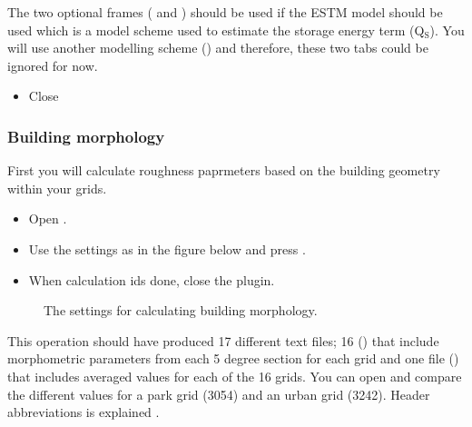 \documentclass[letterpaper,10pt,english]{sphinxmanual}
\begin{document}
The two optional frames ( and ) should be used if the ESTM model should be used which is a model scheme used to estimate the storage energy term (Q$_{\text{S}}$). You will use another modelling scheme () and therefore, these two tabs could be ignored for now.
\begin{itemize}
\item {} 
Close 

\end{itemize}


\subsubsection{Building morphology}
\label{\detokenize{Tutorials/SuewsSpatial:building-morphology}}
First you will calculate roughness paprmeters based on the building geometry within your grids.
\begin{itemize}
\item {} 
Open .

\item {} 
Use the settings as in the figure below and press .

\item {} 
When calculation ids done, close the plugin.

\end{itemize}

\begin{figure}[htbp]
\centering
\capstart

\noindent{}
\caption{The settings for calculating building morphology.}\label{\detokenize{Tutorials/SuewsSpatial:id11}}\end{figure}

This operation should have produced 17 different text files; 16 () that include morphometric parameters from each 5 degree section for each grid and one file () that includes averaged values for each of the 16 grids. You can open  and compare the different values for a park grid (3054) and an urban grid (3242). Header abbreviations is explained {\hyperref[\detokenize{pre-processor/Urban Morphology Morphometric Calculator (Grid):morphometriccalculator-grid}]{}}.
\end{document}
